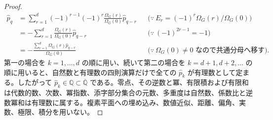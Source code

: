 \documentclass[11pt,a4paper]{article}
\theoremstyle{remark}
\begin{document}
\begin{proof}
\[\begin{aligned}
\widehat p_q
&=
\sum_{r=1}^{d}
(-1)^{r-1}
(-1)^r
\frac{\Omega_G(r)}{\Omega_G(0)}\widehat p_{q-r}
&&\bigl(\because\ E_r=(-1)^r\Omega_G(r)/\Omega_G(0)\bigr)\\
&=
-\sum_{r=1}^{d}
\frac{\Omega_G(r)}{\Omega_G(0)}\widehat p_{q-r}
&&\bigl(\because\ (-1)^{2r-1}=-1\bigr)\\
&=
-\frac{
  \displaystyle
  \sum_{r=1}^{d}\Omega_G(r)\widehat p_{q-r}
}{
  \Omega_G(0)
}
&&\bigl(\because\ \Omega_G(0)\ne0\text{ なので共通分母へ移す}\bigr).
\end{aligned}\]
第一の場合を 
$k=1,\ldots,d$
 の順に用い、続いて第二の場合を 
$k=d+1,d+2,\ldots$
 の順に用いると、自然数と有理数の四則演算だけで全ての 
$\widehat p_k$
 が有理数として定まる。したがって 
$\widehat p_k\in\mathbb Q\subset\overline{\mathbb Q}$
 である。零点、その逆数と冪、有限積および有限和は代数的数、次数、冪指数、添字部分集合の元数、多重度は自然数、係数比と逆数冪和は有理数に属する。複素平面への埋め込み、数値近似、距離、偏角、実数、極限、積分を用いない。

\end{proof}
\end{document}
